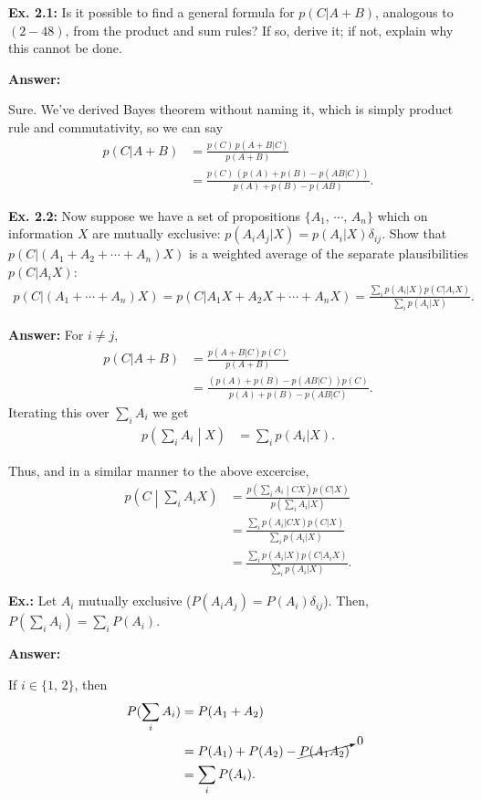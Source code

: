 \documentclass{article}
\begin{document}
\textbf{Ex. 2.1: }Is it possible to find a general formula for $p(C|A+B)$, analogous to $(2-48)$, from the product and sum rules? If so, derive it; if not, explain why this cannot be done.

\textbf{Answer:}

Sure. We've derived Bayes theorem without naming it, which is simply product rule and commutativity, so we can say
\begin{align*}
	p(C|A+B)&=\frac{p(C)\,p(A+B|C)}{p(A+B)}\\
	&=\frac{p(C)\,\left(p(A)+p(B)-p(AB|C)\right)}{p(A)+p(B)-p(AB)}.
\end{align*}

\textbf{Ex. 2.2: }Now suppose we have a set of propositions $\{A_1,\,\cdots,\,A_n\}$ which on information $X$ are mutually exclusive: $p(A_iA_j|X)=p(A_i|X)\delta_{ij}$. Show that $p(C|(A_1+A_2+\cdots+A_n)X)$ is a weighted average of the separate plausibilities $p(C|A_iX)$:
\begin{align*}
	p(C|(A_1+\cdots+A_n)X)=p(C|A_1X+A_2X+\cdots+A_nX)=\frac{\sum_ip(A_i|X)p(C|A_iX)}{\sum_ip(A_i|X)}.
\end{align*}

\textbf{Answer:}
For $i\neq j$,
\begin{align*}
	p(C|A+B)&=\frac{p(A+B|C)p(C)}{p(A+B)}\\
	&=\frac{(p(A)+p(B)-p(AB|C))p(C)}{p(A)+p(B)-p(AB|C)}.
\end{align*}
Iterating this over $\sum_iA_i$ we get
\begin{align*}
	p\left(\sum_iA_i\middle|X\right)&=\sum_ip(A_i|X).
\end{align*}

Thus, and in a similar manner to the above excercise,
\begin{align*}
	p\left(C\middle|\sum_iA_iX\right)&=\frac{p\left(\sum_iA_i\middle|CX\right)p(C|X)}{p(\sum_iA_i|X)}\\
	&=\frac{\sum_ip(A_i|CX)p(C|X)}{\sum_ip(A_i|X)}\\
	&=\frac{\sum_ip(A_i|X)p(C|A_iX)}{\sum_ip(A_i|X)}.
\end{align*}

\textbf{Ex.: }Let $A_i$ mutually exclusive ($P(A_iA_j)=P(A_i)\delta_{ij}$). Then, $P(\sum_iA_i)=\sum_iP(A_i)$.

\textbf{Answer: }

If $i\in\{1,\,2\}$, then
\begin{align}
	P(\sum_iA_i)&=P(A_1+A_2)\\
	&=P(A_1)+P(A_2)-\cancelto0{P(A_1A_2)}\\
	&=\sum_iP(A_i).
\end{align}
\end{document}

